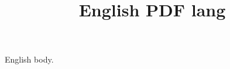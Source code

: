 \documentclass[lang=en]{SUSTechHomework}
\title{English PDF lang}
\begin{document}
\maketitle
English body.
\end{document}
